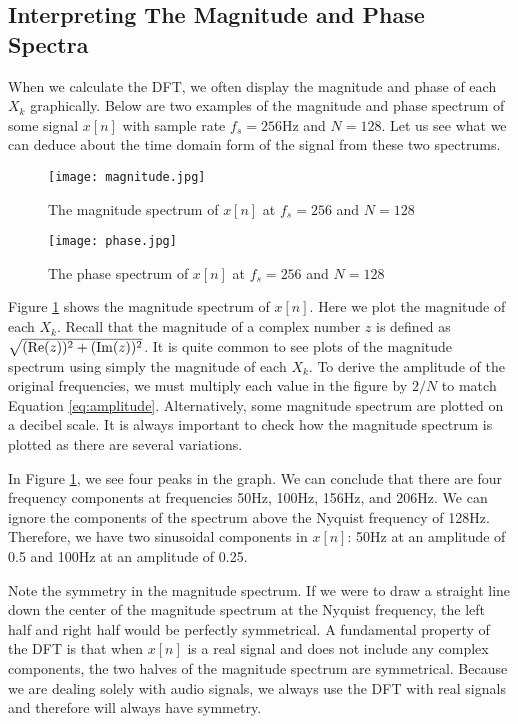\subsection*{Interpreting The Magnitude and Phase Spectra}

When we calculate the DFT,  we often display the magnitude and phase of each $X_k$ graphically.  Below
are two examples of the magnitude and phase spectrum of some signal $x[n]$ with sample rate $f_s = 256$Hz and
$N = 128$.  Let us see what we can deduce about the time domain form of the signal from these two spectrums.

\begin{figure}[h]
	\caption{The magnitude spectrum of $x[n]$ at $f_s = 256$ and $N = 128$}
	\label{fig:magnitudeGraph}
	\begin{center}
	\texttt{[image: magnitude.jpg]}
	\end{center}
\end{figure}

\begin{figure}[h]
	\caption{The phase spectrum of $x[n]$ at $f_s = 256$ and $N = 128$}
	\label{fig:phaseGraph}
	\begin{center}
		\texttt{[image: phase.jpg]}
	\end{center}
\end{figure}

Figure \ref{fig:magnitudeGraph} shows the magnitude spectrum of $x[n]$.  Here we plot the magnitude of
each $X_k$.  Recall that the magnitude of a complex number $z$ is defined as $\sqrt{(\mathrm{Re}(z))^2 + (\mathrm{Im}(z))^2}$.
It is quite common to see plots of the magnitude spectrum
using simply the magnitude of each $X_k$.  To derive the amplitude of the original frequencies, we must multiply
each value in the figure by $2/N$ to match Equation \ref{eq:amplitude}.  
Alternatively, some magnitude spectrum are plotted on a decibel scale.  It is always important to
check how the magnitude spectrum is plotted as there are several variations.

	In Figure \ref{fig:magnitudeGraph}, we see four peaks in the graph.  We can conclude that there are four 
frequency components at frequencies 50Hz, 100Hz, 156Hz, and 206Hz.  
We can ignore the components of the spectrum above the Nyquist frequency of 128Hz. 
Therefore, we have two
sinusoidal components in $x[n]$: 50Hz at an amplitude of 0.5 and 100Hz at an amplitude of 0.25.  

Note the symmetry in the magnitude spectrum.  If we were to draw a straight line down the center of the 
magnitude spectrum at the Nyquist frequency, the left half and right half would be perfectly symmetrical.  
A fundamental property of the DFT is that when $x[n]$ is a real signal and does not include any complex
components, the two halves of the magnitude spectrum are symmetrical.  Because we are dealing solely 
with audio signals,
we always use the DFT with real signals and therefore will always have symmetry.  

